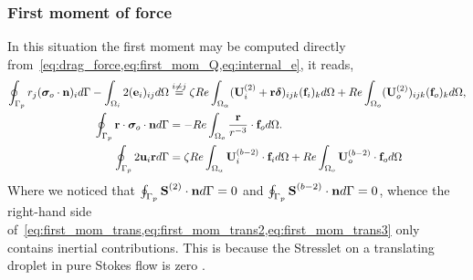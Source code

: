 \subsubsection{First moment of force}

In this situation the first moment may be computed directly from~\ref{eq:drag_force,eq:first_mom_Q,eq:internal_e}, it reads, 
\begin{align}
    \label{eq:first_mom_trans}
        \intS[p]{r_j(\bm\sigma_{o}\cdot \textbf{n})_i}
        - \intO[i]{2(\textbf{e}_i)_{ij}}
        &\overset{i\neq j}{=}
        \zeta Re \intO{(\textbf{U}_{i}^{(2)} + \textbf{r}\bm\delta)_{ijk} (\textbf{f}_{i})_k} 
        + Re\intO[o]{(\textbf{U}_{o}^{(2)})_{ijk}(\textbf{f}_{o})_k},
    \\
    \label{eq:first_mom_trans2}
    \intS[p]{\textbf{r} \cdot  \bm\sigma_{o}\cdot \textbf{n}}
    &=
    - Re\intO[o]{\frac{\textbf{r}}{r^{-3}}\cdot \textbf{f}_{o}}. \\
    \label{eq:first_mom_trans3}
    \intS[p]{2\textbf{u}_{i} \textbf{r}}
    &=
    \zeta Re \intO{\textbf{U}_{i}^{(b-2)}\cdot \textbf{f}_{i}} 
    + Re\intO[o]{\textbf{U}_{o}^{(b-2)}\cdot \textbf{f}_{o}}
\end{align}
Where we noticed that $\intS[p]{\textbf{S}^{(2)}\cdot \textbf{n}} = 0$ and $\intS[p]{\textbf{S}^{(b-2)}\cdot \textbf{n}} = 0$, whence the right-hand side of~\ref{eq:first_mom_trans,eq:first_mom_trans2,eq:first_mom_trans3} only contains inertial contributions. 
This is because the Stresslet on a translating droplet in pure Stokes flow is zero \citep{kim2013microhydrodynamics}. 

